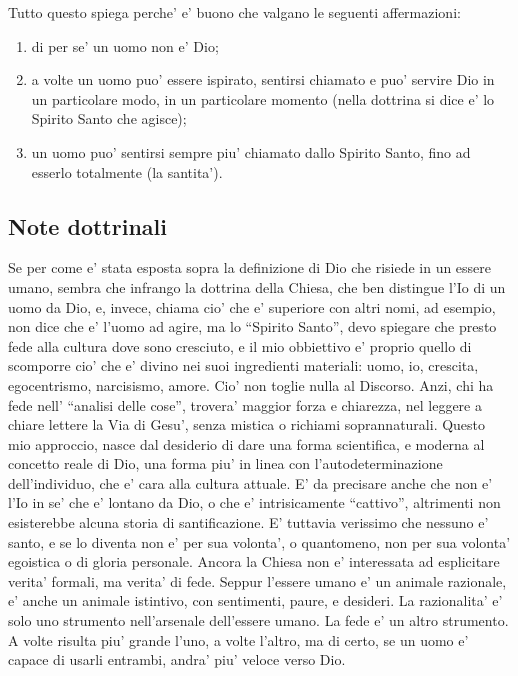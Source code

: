 Tutto questo spiega perche' e' buono che valgano le seguenti affermazioni:
\begin{enumerate}
    \item di per se' un uomo non e' Dio;
    \item a volte un uomo puo' essere ispirato, sentirsi chiamato e puo' servire Dio in un particolare modo, in un particolare momento (nella dottrina si dice e' lo Spirito Santo che agisce);
    \item un uomo puo' sentirsi sempre piu' chiamato dallo Spirito Santo, fino ad esserlo totalmente (la santita').
\end{enumerate}

\subsection{Note dottrinali}
Se per come e' stata esposta sopra la definizione di Dio che risiede in un essere umano, sembra che infrango la dottrina della Chiesa, che ben distingue l'Io di un uomo da Dio, e, invece, chiama cio' che e' superiore con altri nomi, ad esempio, non dice che e' l'uomo ad agire, ma lo ``Spirito Santo'', devo spiegare che presto fede alla cultura dove sono cresciuto, e il mio obbiettivo e' proprio quello di scomporre cio' che e' divino nei suoi ingredienti materiali: uomo, io, crescita, egocentrismo, narcisismo, amore. 
Cio' non toglie nulla al Discorso. Anzi, chi ha fede nell' ``analisi delle cose'', trovera' maggior forza e chiarezza, nel leggere a chiare lettere la Via di Gesu', senza mistica o richiami soprannaturali. Questo mio approccio, nasce dal desiderio di dare una forma scientifica, e moderna al concetto reale di Dio, una forma piu' in linea con l'autodeterminazione dell'individuo, che e' cara alla cultura attuale. E' da precisare anche che non e' l'Io in se' che e' lontano da Dio, o che e' intrisicamente ``cattivo'', altrimenti non esisterebbe alcuna storia di santificazione.
E' tuttavia verissimo che nessuno e' santo, e se lo diventa non e' per sua volonta', o quantomeno, non per sua volonta' egoistica o di gloria personale.
Ancora la Chiesa non e' interessata ad esplicitare verita' formali, ma verita' di fede. Seppur l'essere umano e' un animale razionale, e' anche un animale istintivo, con sentimenti, paure, e desideri. La razionalita' e' solo uno strumento nell'arsenale dell'essere umano. La fede e' un altro strumento. A volte risulta piu' grande l'uno, a volte l'altro, ma di certo, se un uomo e' capace di usarli entrambi, andra' piu' veloce verso Dio.\\
